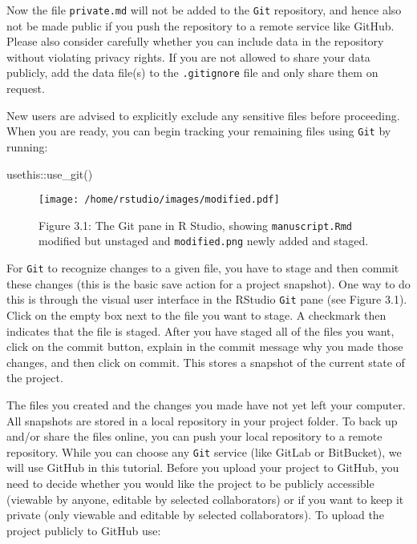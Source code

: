 \documentclass[psych,tutorial,submit,moreauthors,pdftex]{mdpi}
\newenvironment{Shaded}{\begin{snugshade}}{\end{snugshade}}
\newcommand{\FunctionTok}[1]{\textcolor[rgb]{0.00,0.00,0.00}{#1}}
\newcommand{\NormalTok}[1]{#1}
\newcommand{\SpecialCharTok}[1]{\textcolor[rgb]{0.00,0.00,0.00}{#1}}
\begin{document}
Now the file \texttt{private.md} will not be added to the \texttt{Git}
repository, and hence also not be made public if you push the repository
to a remote service like GitHub. Please also consider carefully whether
you can include data in the repository without violating privacy rights.
If you are not allowed to share your data publicly, add the data file(s)
to the \texttt{.gitignore} file and only share them on request.

New users are advised to explicitly exclude any sensitive files before
proceeding. When you are ready, you can begin tracking your remaining
files using \texttt{Git} by running:

\begin{Shaded}
\begin{Highlighting}[]
\NormalTok{usethis}\SpecialCharTok{::}\FunctionTok{use\_git}\NormalTok{()}
\end{Highlighting}
\end{Shaded}

\begin{figure}
\centering
\texttt{[image: /home/rstudio/images/modified.pdf]}
\caption{Figure 3.1: The Git pane in R Studio, showing
\texttt{manuscript.Rmd} modified but unstaged and \texttt{modified.png}
newly added and staged.}
\end{figure}

For \texttt{Git} to recognize changes to a given file, you have to stage
and then commit these changes (this is the basic save action for a
project snapshot). One way to do this is through the visual user
interface in the RStudio \texttt{Git} pane (see Figure 3.1). Click on
the empty box next to the file you want to stage. A checkmark then
indicates that the file is staged. After you have staged all of the
files you want, click on the commit button, explain in the commit
message why you made those changes, and then click on commit. This
stores a snapshot of the current state of the project.

The files you created and the changes you made have not yet left your
computer. All snapshots are stored in a local repository in your project
folder. To back up and/or share the files online, you can push your
local repository to a remote repository. While you can choose any
\texttt{Git} service (like GitLab or BitBucket), we will use GitHub in
this tutorial. Before you upload your project to GitHub, you need to
decide whether you would like the project to be publicly accessible
(viewable by anyone, editable by selected collaborators) or if you want
to keep it private (only viewable and editable by selected
collaborators). To upload the project publicly to GitHub use:
\end{document}

